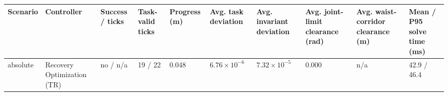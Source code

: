 \begin{tabular}{llllllllll}
\toprule
Scenario & Controller & Success / ticks & Task-valid ticks & Progress (m) & Avg. task deviation & Avg. invariant deviation & Avg. joint-limit clearance (rad) & Avg. waist-corridor clearance (m) & Mean / P95 solve time (ms) \\
\midrule
absolute & Recovery Optimization (TR) & no / n/a & 19 / 22 & 0.048 & $6.76\times 10^{-6}$ & $7.32\times 10^{-5}$ & 0.000 & n/a & 42.9 / 46.4 \\
\bottomrule
\end{tabular}
